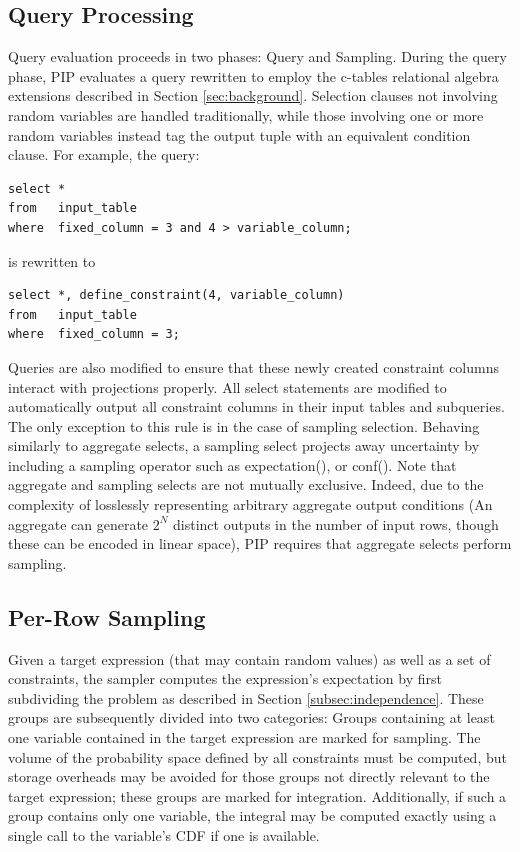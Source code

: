 \subsection{Query Processing}
Query evaluation proceeds in two phases: Query and Sampling.  During the query phase, PIP evaluates a query rewritten to employ the c-tables relational algebra extensions described in Section \ref{sec:background}.  Selection clauses not involving random variables are handled traditionally, while those involving one or more random variables instead tag the output tuple with an equivalent condition clause.  For example, the query:

\begin{verbatim}
select *
from   input_table
where  fixed_column = 3 and 4 > variable_column;
\end{verbatim}
%
is rewritten to
%
\begin{verbatim}
select *, define_constraint(4, variable_column)
from   input_table
where  fixed_column = 3;
\end{verbatim}

Queries are also modified to ensure that these newly created constraint columns interact with projections properly.  All select statements are modified to automatically output all constraint columns in their input tables and subqueries.  The only exception to this rule is in the case of sampling selection.  Behaving similarly to aggregate selects, a sampling select projects away uncertainty by including a sampling operator such as expectation(), or conf().  Note that aggregate and sampling selects are not mutually exclusive.  Indeed, due to the complexity of losslessly representing arbitrary aggregate output conditions (An aggregate can generate $2^{N}$ distinct outputs in the number of input rows, though these can be encoded in linear space), PIP requires that aggregate selects perform sampling. 

\subsection{Per-Row Sampling}
Given a target expression (that may contain random values) as well as a set of constraints, the sampler computes the expression's expectation by first subdividing the problem as described in Section \ref{subsec:independence}.  These groups are subsequently divided into two categories: Groups containing at least one variable contained in the target expression are marked for sampling.  The volume of the probability space defined by all constraints must be computed, but storage overheads may be avoided for those groups not directly relevant to the target expression; these groups are marked for integration.  Additionally, if such a group contains only one variable, the integral may be computed exactly using a single call to the variable's CDF if one is available.

